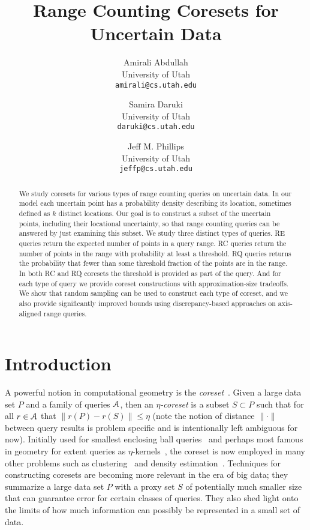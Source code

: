 \documentclass[11pt]{myclass}
\title{Range Counting Coresets for Uncertain Data}
\author{Amirali Abdullah \\ {\small University of Utah} \\ {\small \texttt{amirali@cs.utah.edu}}
\and 
Samira Daruki \\ {\small University of Utah} \\ {\small \texttt{daruki@cs.utah.edu}}
\and 
Jeff M. Phillips \\ {\small University of Utah} \\ {\small \texttt{jeffp@cs.utah.edu}}}
\newcommand{\Eu}[1]{\ensuremath{\EuScript{#1}}}
\newcommand{\RC}{\textsf{RC}\xspace}
\newcommand{\RE}{\textsf{RE}\xspace}
\newcommand{\RQ}{\textsf{RQ}\xspace}
\begin{document}
\maketitle

\begin{abstract}
We study coresets for various types of range counting queries on uncertain data.  In our model each uncertain point has a probability density describing its location, sometimes defined as $k$ distinct locations.  Our goal is to construct a subset of the uncertain points, including their locational uncertainty, so that range counting queries can be answered by just examining this subset.  
We study three distinct types of queries.
\RE queries return the expected number of points in a query range.  
\RC queries return the number of points in the range with probability at least a threshold.
\RQ queries returns the probability that fewer than some threshold fraction of the points are in the range.
In both \RC and \RQ coresets the threshold is provided as part of the query.  
And for each type of query we provide coreset constructions with approximation-size tradeoffs.  
We show that random sampling can be used to construct each type of coreset, and we also provide significantly improved bounds using discrepancy-based approaches on axis-aligned range queries.  
\end{abstract}


\section{Introduction}
A powerful notion in computational geometry is the \emph{coreset}~\cite{AHV04,AHV07,BC03,VC71}.  Given a large data set $P$ and a family of queries $\Eu{A}$, then an \emph{$\eta$-coreset} is a subset $S \subset P$ such that for all $r \in \Eu{A}$ that $\|r(P) - r(S)\| \leq \eta$ (note the notion of distance $\|  \cdot \|$ between query results is problem specific and is intentionally left ambiguous for now).  Initially used for smallest enclosing ball queries~\cite{BC03} and perhaps most famous in geometry for extent queries as $\eta$-kernels~\cite{AHV04,AHV07}, the coreset is now employed in many other problems such as clustering~\cite{BHP02} and density estimation~\cite{VC71}.  
Techniques for constructing coresets are becoming more relevant in the era of big data; they summarize a large data set $P$ with a proxy set $S$ of potentially much smaller size that can guarantee error for certain classes of queries.  They also shed light onto the limits of how much information can possibly be represented in a small set of data.  
\end{document}
